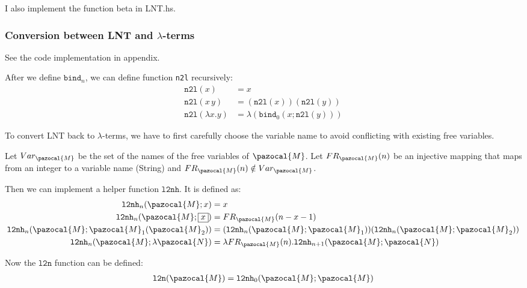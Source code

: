 \documentclass{article}
\theoremstyle{definition}
\newcommand{\lb}{$\lambda$}
\begin{document}
I also implement the function \textsf{beta} in \textsf{LNT.hs}.

\subsubsection*{Conversion between LNT and \lb-terms}

See the code implementation in appendix.

After we define $\mathtt{bind}_n$, we can define function \texttt{n2l} recursively:
\begin{align*}
    \mathtt{n2l}(x)           & = x                                            \\
    \mathtt{n2l}(x\, y)       & = (\mathtt{n2l}(x))(\mathtt{n2l}(y))           \\
    \mathtt{n2l}(\lambda x.y) & = \lambda (\mathtt{bind}_0(x;\mathtt{n2l}(y)))
\end{align*}

To convert LNT back to \lb-terms, we have to first carefully choose the variable name to avoid conflicting with existing free variables.

Let $Var_\pazocal{M}$ be the set of the names of the free variables of $\pazocal{M}$.
Let $FR_\pazocal{M}(n)$ be an injective mapping that maps from an integer to a variable name (String) and $FR_\pazocal{M}(n)\notin Var_\pazocal{M}$.

Then we can implement a helper function $\mathtt{l2nh}$.
It is defined as:
\begin{align*}
    \mathtt{l2nh}_n(\pazocal{M};x)                            & = x                                                                                        \\
    \mathtt{l2nh}_n(\pazocal{M};\fbox{$x$})                   & = FR_\pazocal{M}(n - x -1)                                                                 \\
    \mathtt{l2nh}_n(\pazocal{M};\pazocal{M}_1(\pazocal{M}_2)) & = (\mathtt{l2nh}_n(\pazocal{M};\pazocal{M}_1))(\mathtt{l2nh}_n(\pazocal{M};\pazocal{M}_2)) \\
    \mathtt{l2nh}_n(\pazocal{M};\lambda \pazocal{N})          & = \lambda FR_\pazocal{M}(n).\mathtt{l2nh}_{n+1}(\pazocal{M};\pazocal{N})                   \\
\end{align*}

Now the $\mathtt{l2n}$ function can be defined:
\begin{align*}
    \mathtt{l2n}(\pazocal{M}) = \mathtt{l2nh}_0(\pazocal{M};\pazocal{M})
\end{align*}
\end{document}
